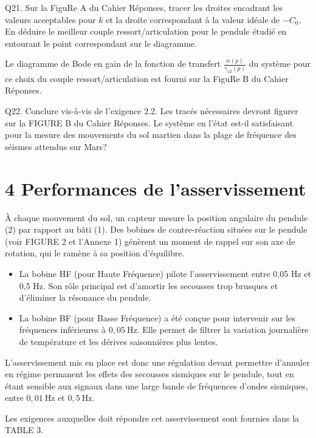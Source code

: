 {Q21. Sur la FiguRe A du Cahier Réponses, tracer les droites encadrant les valeurs acceptables pour $k$ et la droite correspondant à la valeur idéale de $-C_{0}$. En déduire le meilleur couple ressort/articulation pour le pendule étudié en entourant le point correspondant sur le diagramme.

Le diagramme de Bode en gain de la fonction de transfert $\frac{\alpha(p)}{\gamma_{x 2}(p)}$ du système pour ce choix du couple ressort/articulation est fourni sur la FiguRe B du Cahier Réponses.

Q22. Conclure vis-à-vis de l'exigence 2.2. Les tracés nécessaires devront figurer sur la FIGURE B du Cahier Réponses. Le système en l'état est-il satisfaisant pour la mesure des mouvements du sol martien dans la plage de fréquence des séismes attendus sur Mars?

\section*{4 Performances de l'asservissement}
À chaque mouvement du sol, un capteur mesure la position angulaire du pendule (2) par rapport au bâti (1). Des bobines de contre-réaction situées sur le pendule (voir FIGURE 2 et l'Annexe 1) génèrent un moment de rappel sur son axe de rotation, qui le ramène à sa position d'équilibre.

\begin{itemize}
  \item La bobine HF (pour Haute Fréquence) pilote l'asservissement entre 0,05 Hz et 0,5 Hz. Son rôle principal est d'amortir les secousses trop brusques et d'éliminer la résonance du pendule.
  \item La bobine BF (pour Basse Fréquence) a été conçue pour intervenir sur les fréquences inférieures à $0,05 \mathrm{~Hz}$. Elle permet de filtrer la variation journalière de température et les dérives saisonnières plus lentes.
\end{itemize}

L'asservissement mis en place est donc une régulation devant permettre d'annuler en régime permanent les effets des secousses sismiques sur le pendule, tout en étant sensible aux signaux dans une large bande de fréquences d'ondes sismiques, entre $0,01 \mathrm{~Hz}$ et $0,5 \mathrm{~Hz}$.

Les exigences auxquelles doit répondre cet asservissement sont fournies dans la TABLE 3.

}
